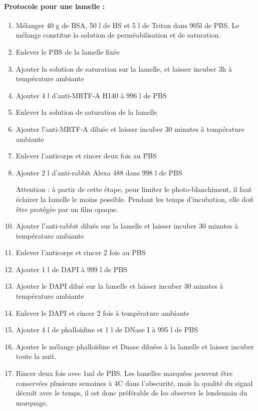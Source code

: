 \paragraph{Protocole pour une lamelle : }
\begin{enumerate}
\item Mélanger 40 \micro g de BSA, 50 \micro l de HS et 5 \micro l de Triton dans 905\micro l de PBS. Le mélange constitue la solution de perméabilisation et de saturation.
\item Enlever le PBS de la lamelle fixée
\item Ajouter la solution de saturation sur la lamelle, et laisser incuber 3h à température ambiante
\item Ajouter 4 \micro l d'anti-MRTF-A H140 à 996 \micro l de PBS
\item Enlever la solution de saturation de la lamelle
\item Ajouter l'anti-MRTF-A diluée et laisser incuber 30 minutes à température ambiante
\item Enlever l'anticorps et rincer deux fois au PBS
\item Ajouter 2 \micro l d'anti-rabbit Alexa 488 dans 998 \micro l de PBS
\item[Attention : ] à partir de cette étape, pour limiter le photo-blanchiment, il faut éclairer la lamelle le moins possible. Pendant les temps d'incubation, elle doit être protégée par un film opaque. 
\item Ajouter l'anti-rabbit diluée sur la lamelle et laisser incuber 30 minutes à température ambiante
\item Enlever l'anticorps et rincer 2 fois au PBS
\item Ajouter 1 \micro l de DAPI à 999 \micro l de PBS
\item Ajouter le DAPI dilué sur la lamelle et laisser incuber 30 minutes à température ambiante
\item Enlever le DAPI et rincer 2 fois à température ambiante
\item Ajouter 4 \micro l de phalloïdine et 1 \micro l de DNase I à 995 \micro l de PBS
\item Ajouter le mélange phalloïdine et Dnase diluées à la lamelle et laisser incuber toute la nuit.
\item Rincer deux fois avec 1ml de PBS. Les lamelles marquées peuvent être conservées plusieurs semaines à 4\degres C dans l'obscurité, mais la qualité du signal décroît avec le temps, il est donc préférable de les observer le lendemain du marquage.

\end{enumerate}

